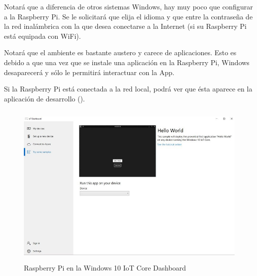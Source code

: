 \documentclass[letterpaper,10.5pt]{article}
\begin{document}
Notará que a diferencia de otros sistemas Windows, hay muy poco que configurar a la Raspberry Pi.
Se le solicitará que elija el idioma y que entre la contraseña de la red inalámbrica con la que desea conectarse a la Internet (si su Raspberry Pi está equipada con WiFi).

Notará que el ambiente es bastante austero y carece de aplicaciones.
Esto es debido a que una vez que se instale una aplicación en la Raspberry Pi, Windows desaparecerá y sólo le permitirá interactuar con la App.

Si la Raspberry Pi está conectada a la red local, podrá ver que ésta aparece en la aplicación de desarrollo ().

\begin{figure}[H]
	\centering%
	\includegraphics[width=0.9\columnwidth,height=8cm,keepaspectratio]{img/p02-05.jpg} %
	\caption{Raspberry Pi en la Windows 10 IoT Core Dashboard}
	\label{fig:listed-pi} %
\end{figure}
\end{document}
